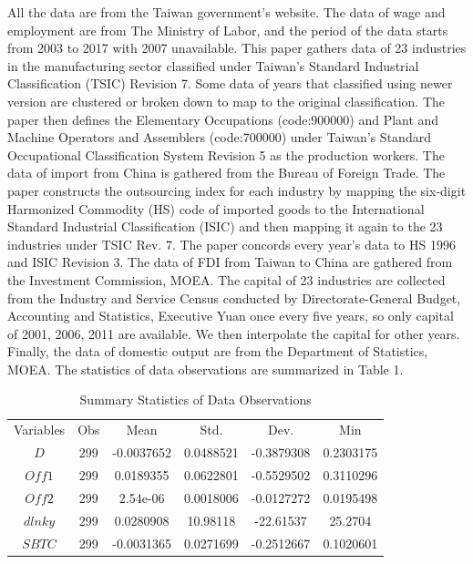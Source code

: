 \documentclass{article}
\begin{document}
All the data are from the Taiwan government’s website. The data of wage and employment are from The Ministry of Labor, and the period of the data starts from 2003 to 2017 with 2007 unavailable. This paper gathers data of 23 industries in the manufacturing sector classified under Taiwan’s Standard Industrial Classification (TSIC) Revision 7. Some data of years that classified using newer version are clustered or broken down to map to the original classification. The paper then defines the Elementary Occupations (code:900000) and Plant and Machine Operators and Assemblers (code:700000) under Taiwan’s Standard Occupational Classification System Revision 5 as the production workers. The data of import from China is gathered from the Bureau of Foreign Trade. The paper constructs the outsourcing index for each industry by mapping the six-digit Harmonized Commodity (HS) code of imported goods to the International Standard Industrial Classification (ISIC) and then mapping it again to the 23 industries under TSIC Rev. 7. The paper concords every year’s data to HS 1996 and ISIC Revision 3. The data of FDI from Taiwan to China are gathered from the Investment Commission, MOEA. The capital of 23 industries are collected from the Industry and Service Census conducted by Directorate-General Budget, Accounting and Statistics, Executive Yuan once every five years, so only capital of 2001, 2006, 2011 are available. We then interpolate the capital for other years. Finally, the data of domestic output are from the Department of Statistics, MOEA. The statistics of data observations are summarized in Table 1.

\begin{table}[]
    \centering
    \begin{tabular}{ |cccccc| } 
 \hline
 Variables & Obs & Mean & Std. & Dev. & Min\\
 $D$ & 299 & -0.0037652 & 0.0488521 & -0.3879308 & 0.2303175 \\ 
 $Off1$ & 299 & 0.0189355 & 0.0622801 & -0.5529502 & 0.3110296 \\ 
 $Off2$ & 299 & 2.54e-06 & 0.0018006 & -0.0127272 & 0.0195498 \\ 
 $dlnky$ & 299 & 0.0280908 & 10.98118 & -22.61537 & 25.2704\\
 $SBTC$ & 299 & -0.0031365 & 0.0271699 & -0.2512667 & 0.1020601\\
 \hline
\end{tabular}
    \caption{Summary Statistics of Data Observations}
    \label{tab:1}
\end{table}
\end{document}

